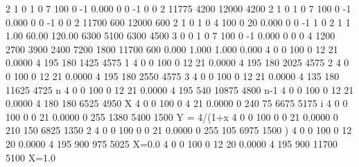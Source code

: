 2 1 0 1 0 7 100 0 -1 0.000 0 0 -1 0 0 2
	 11775 4200 12000 4200
2 1 0 1 0 7 100 0 -1 0.000 0 0 -1 0 0 2
	 11700 600 12000 600
2 1 0 1 0 4 100 0 20 0.000 0 0 -1 1 0 2
	1 1 1.00 60.00 120.00
	 6300 5100 6300 4500
3 0 0 1 0 7 100 0 -1 0.000 0 0 0 4
	 1200 2700 3900 2400 7200 1800 11700 600
	 0.000 1.000 1.000 0.000
4 0 0 100 0 12 21 0.0000 4 195 180 1425 4575 1
4 0 0 100 0 12 21 0.0000 4 195 180 2025 4575 2
4 0 0 100 0 12 21 0.0000 4 195 180 2550 4575 3
4 0 0 100 0 12 21 0.0000 4 135 180 11625 4725 n
4 0 0 100 0 12 21 0.0000 4 195 540 10875 4800 n-1
4 0 0 100 0 12 21 0.0000 4 180 180 6525 4950 X
4 0 0 100 0 4 21 0.0000 0 240 75 6675 5175 i
4 0 0 100 0 0 21 0.0000 0 255 1380 5400 1500 Y = 4/(1+x
4 0 0 100 0 0 21 0.0000 0 210 150 6825 1350 2
4 0 0 100 0 0 21 0.0000 0 255 105 6975 1500 )
4 0 0 100 0 12 20 0.0000 4 195 900 975 5025 X=0.0
4 0 0 100 0 12 20 0.0000 4 195 900 11700 5100 X=1.0
